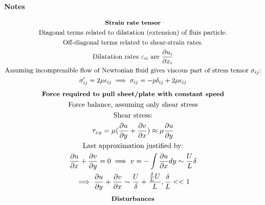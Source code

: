 \documentclass[10pt, a4paper]{article}
\newcommand{\derivative}[2]{\frac{\partial #1}{\partial #2}}
\begin{document}

\begin{center}
    \Large
    \textbf{Notes}
    \vspace{0.5cm}
\end{center}
\begin{multicols*}{2}
    \begin{gather*}
        \textbf{\small Strain rate tensor} \\
        \text{Diagonal terms related to dilatation (extension) of fluis particle.} \\
        \text{Off-diagonal terms related to shear-strain rates.} \\
        \text{Dilatation rates $\varepsilon_{ii}$ are $\derivative{ u_i}{x_i}$}\\
        \text{Assuming incompressible flow of Newtonian fluid gives viscous part of stress tensor $\sigma_{ij}$:} \\
        \sigma_{ij}' = 2\mu\epsilon_{ij} \implies \sigma_{ij} = -p\delta_{ij} + 2\mu\epsilon_{ij}
    \end{gather*}
    \begin{gather*}
        \textbf{\small Force required to pull sheet/plate with constant speed} \\
        \text{Force balance, assuming only shear stress} \\
        \text{Shear stress:} \\
        \tau_{xy} = \mu(\derivative{u}{y} + \derivative{v}{x}) \approx \mu\derivative{u}{y} \\
        \text{Last approximation justified by:} \\
        \derivative{u}{x} + \derivative{v}{y} = 0 \implies v = -\int\derivative{u}{x}dy \sim \frac{U}{L}\delta \\
        \implies \derivative{u}{y} + \derivative{v}{x} \sim \frac{U}{\delta} + \frac{\frac{\delta}{L}U}{L}, \frac{\delta}{L} << 1 \\
    \end{gather*}
    \begin{gather*}
        \textbf{\small Disturbances} \\

\end{gather*}
\end{multicols*}
\end{document}
